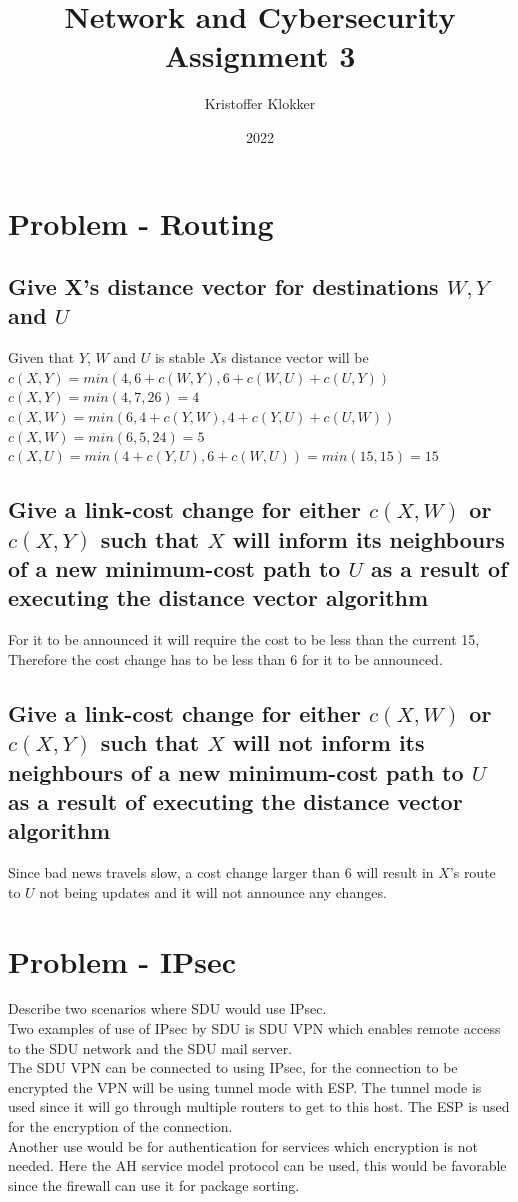 \documentclass[12pt, a4paper]{article}
\title{Network and Cybersecurity\\ Assignment 3}
\date{2022}
\author{Kristoffer Klokker}
\begin{document}
	\maketitle
	\clearpage
	\tableofcontents
	\clearpage
	\section{Problem - Routing}
		\subsection{Give X's distance vector for destinations $W,Y$ and $U$}
			Given that $Y$, $W$ and $U$ is stable $X$s distance vector will be\\
			$c(X,Y)=min(4,6+c(W,Y),6+c(W,U)+c(U,Y))$\\
			$c(X,Y)=min(4,7,26)=4$\\
			$c(X,W)=min(6,4+c(Y,W),4+c(Y,U)+c(U,W))$\\
			$c(X,W)=min(6,5,24)=5$\\
			$c(X,U)=min(4+c(Y,U),6+c(W,U))=min(15,15)=15$
		\subsection{Give a link-cost change for either $c(X,W)$ or $c(X,Y)$ such that $X$ will inform its neighbours of a new minimum-cost path to $U$ as a result of executing the distance vector algorithm}
			For it to be announced it will require the cost to be less than the current 15, Therefore the cost change has to be less than 6 for it to be announced.
		\subsection{Give a link-cost change for either $c(X,W)$ or $c(X,Y)$ such that $X$ will not inform its neighbours of a new minimum-cost path to $U$ as a result of executing the distance vector algorithm}
			Since bad news travels slow, a cost change larger than 6 will result in $X$'s route to $U$ not being updates and it will not announce any changes.
	\clearpage
	\section{Problem - IPsec}
		Describe two scenarios where SDU would use IPsec.\\
		Two examples of use of IPsec by SDU is SDU VPN which enables remote access to the SDU network and the SDU mail server.\\
		The SDU VPN can be connected to using IPsec, for the connection to be encrypted the VPN will be using tunnel mode with ESP. The tunnel mode is used since it will go through multiple routers to get to this host. The ESP is used for the encryption of the connection.\\
		Another use would be for authentication for services which encryption is not needed. Here the AH service model protocol can be used, this would be favorable since the firewall can use it for package sorting.
\end{document}
